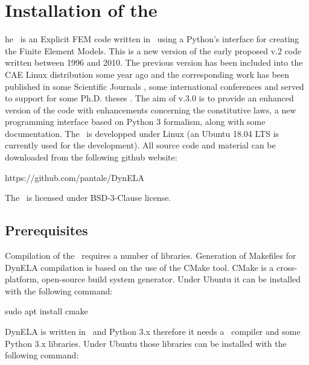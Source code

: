 \chapter{Installation of the \DynELA}\label{Chapter!Installation}

\startcontents[chapters]
\printmyminitoc[1]he \DynELA~is an Explicit FEM code written in \Cpp~using a Python's interface for creating the Finite Element Models. This is a new version of the early proposed v.2 code written between 1996 and 2010. The previous version has been included into the CAE Linux distribution some year ago and the corresponding work has been published in some Scientific Journals \cite{
pantale_object-oriented_2002,
pantale_development_2004,
pantale_parallelization_2005,
menanteau_methodology_2006,
nistor_numerical_2007,
nistor_numerical_2008,
pantale_rp_2020}
, some international conferences \cite{
menanteau_coupled_2005,
nistor_modeling_2005,
pantale_strategies_2005,
pantale_developpement_2004,
pantale_developpement_1999,
pantale_development_2002}
 and served to support for some Ph.D. theses \cite{
menanteau_developpement_2004,
nistor_identification_2005}
. The aim of v.3.0 is to provide an enhanced version of the code with enhancements concerning the constitutive laws, a new programming interface based on Python 3 formalism, along with some documentation.
The \DynELA~is developped under Linux (an Ubuntu 18.04 LTS is currently used for the development). All source code and material can be downloaded from the following github website:

\hspace*{1cm}\textsf{https://github.com/pantale/DynELA}

The \DynELA~is licensed under BSD-3-Clause license.

\section{Prerequisites}

Compilation of the \DynELA~requires a number of libraries.
Generation of Makefiles for DynELA compilation is based on the use of the CMake tool. CMake is a cross-platform, open-source build system generator. Under Ubuntu it can be installed with the following command:

\begin{BashListing}[numbers=none]
sudo apt install cmake
\end{BashListing}

DynELA is written in \Cpp~and Python 3.x therefore it needs a \Cpp~compiler and some Python 3.x libraries. Under Ubuntu those libraries can be installed with the following command:

